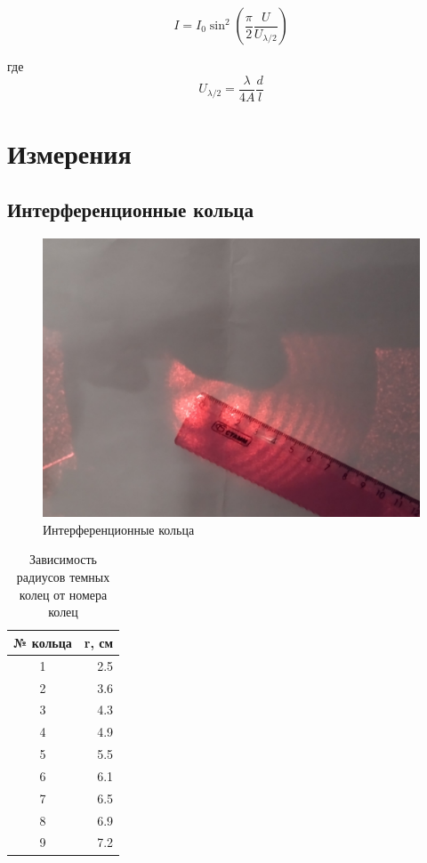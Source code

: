 \documentclass{article}
\begin{document}
\begin{equation}
    I = I_0 \sin^2\left(\frac{\pi}{2}\frac{U}{U_{\lambda/2}}\right)
    \label{eq:pokkels}
\end{equation}

где
\begin{equation}
    U_{\lambda/2} = \frac{\lambda}{4A} \frac{d}{l}
    \label{eq:poluvolnovoe_napryajenie}
\end{equation}

\vspace{1cm}
\section{Измерения}
\subsection{Интерференционные кольца}
\begin{figure}[h]
    \center\includegraphics[width = 0.5\linewidth]{kolca.jpg}
    \caption{Интерференционные кольца}\label{fig:kolca}
\end{figure}

\begin{table}[h]
\begin{center}
\begin{tabular}{cr}
\toprule
 № кольца &  r, см \\
\midrule
 1 & 2.5 \\
 2 & 3.6 \\
 3 & 4.3 \\
 4 & 4.9 \\
 5 & 5.5 \\\midrule
 6 & 6.1 \\
 7 & 6.5 \\
 8 & 6.9 \\
 9 & 7.2 \\
\bottomrule
\end{tabular}
\caption{Зависимость радиусов темных колец от номера колец}
\end{center}
\end{table}
\end{document}
